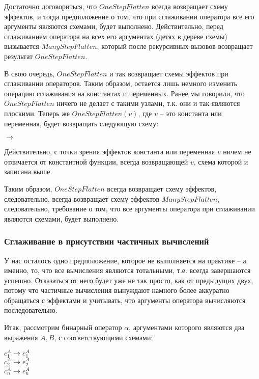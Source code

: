 Достаточно договориться, что $OneStepFlatten$ всегда возвращает схему эффектов, и тогда предположение о том, что при сглаживании оператора все его аргументы являются схемами, будет выполнено. Действительно, перед сглаживанием оператора на всех его аргументах (детях в дереве схемы) вызывается $ManyStepFlatten$, который после рекурсивных вызовов возвращает результат $OneStepFlatten$.

В свою очередь, $OneStepFlatten$ и так возвращает схемы эффектов при сглаживании операторов. Таким образом, остается лишь немного изменить операцию сглаживания на константах и переменных. Ранее мы говорили, что $OneStepFlatten$ ничего не делает с такими узлами, т.к. они и так являются плоскими. Теперь же $OneStepFlatten(v)$, где $v$ -- это константа или переменная, будет возвращать следующую схему: 

{
	 $\rightarrow$ 	
}{}

Действительно, с точки зрения эффектов константа или переменная $v$ ничем не отличается от константной функции, всегда возвращающей $v$, схема которой и записана выше. 

Таким образом, $OneStepFlatten$ всегда возвращает схему эффектов, следовательно, всегда возвращает схему эффектов $ManyStepFlatten$, следовательно, требование о том, что все аргументы оператора при сглаживании являются схемами, будет выполнено.


\subsubsection{Сглаживание в присутствии частичных вычислений}

У нас осталось одно предположение, которое не выполняется на практике -- а именно, то, что все вычисления являются тотальными, т.е. всегда завершаются успешно. Отказаться от него будет уже не так просто, как от предыдущих двух, потому что частичные вычисления вынуждают намного более аккуратно обращаться с эффектами и учитывать, что аргументы оператора вычисляются последовательно. 

Итак, рассмотрим бинарный оператор $\alpha$, аргументами которого являются два выражения $A, B$, с соответствующими схемами:

{
	$c^A_1 \rightarrow e^A_1$ \\
	$c^A_2 \rightarrow e^A_2$ \\
	$\ldots$ \\
	$c^A_n \rightarrow e^A_n$ \\
}{}


